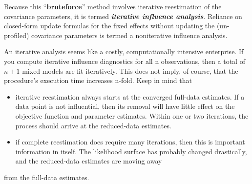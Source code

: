 \documentclass[12pt, a4paper]{article}
\begin{document}
	Because this “\textbf{bruteforce}”
	method involves iterative reestimation of the covariance parameters, it is termed \textbf{\textit{iterative influence
			analysis}}. Reliance on closed-form update formulas for the fixed effects without updating the (un-profiled)
	covariance parameters is termed a noniterative influence analysis.
	
	An iterative analysis seems like a costly, computationally intensive enterprise. If you compute iterative
	influence diagnostics for all n observations, then a total of $n + 1$ mixed models are fit iteratively. This does
	not imply, of course, that the procedure’s execution time increases n-fold. Keep in mind that
	\begin{itemize}
		\item iterative reestimation always starts at the converged full-data estimates. If a data point is not influential,
		then its removal will have little effect on the objective function and parameter estimates. Within
		one or two iterations, the process should arrive at the reduced-data estimates.
		\item if complete reestimation does require many iterations, then this is important information in itself. The
		likelihood surface has probably changed drastically, and the reduced-data estimates are moving away
	\end{itemize}
	from the full-data estimates.
			
			
			
		
\end{document}

